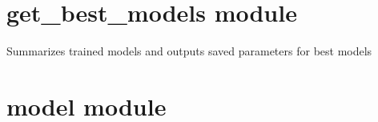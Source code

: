 \documentclass[letterpaper,10pt,english]{sphinxmanual}
\begin{document}
\sphinxstepscope


\section{get\_best\_models module}
\label{\detokenize{get_best_models:module-get_best_models}}\label{\detokenize{get_best_models:get-best-models-module}}\label{\detokenize{get_best_models::doc}}

\begin{fulllineitems}
\label{\detokenize{get_best_models:get_best_models.main}}
\pysigstartsignatures
{}
\pysigstopsignatures
\sphinxAtStartPar
Summarizes trained models and outputs saved parameters for best models

\end{fulllineitems}


\sphinxstepscope


\section{model module}
\label{\detokenize{model:module-model}}\label{\detokenize{model:model-module}}\label{\detokenize{model::doc}}
\end{document}
